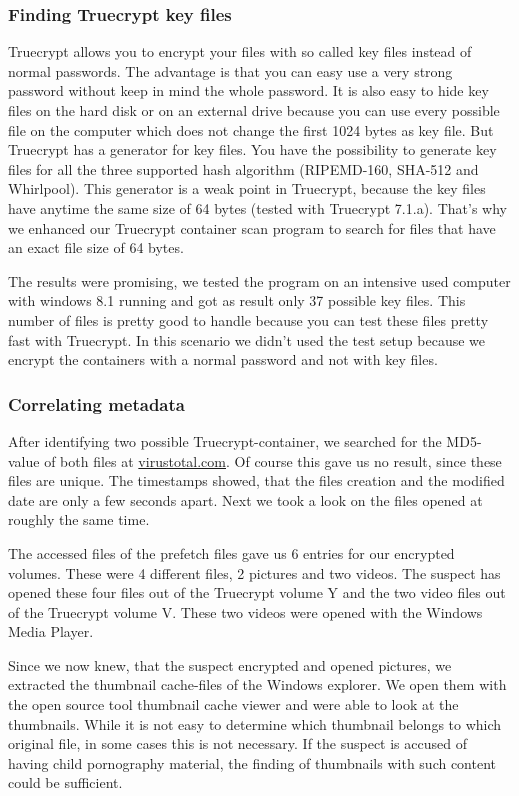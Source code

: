 \subsubsection{Finding Truecrypt key files}
Truecrypt allows you to encrypt your files with so called key files instead of normal passwords. The advantage is that you can easy use a very strong password without keep in mind the whole password. It is also easy to hide key files on the hard disk or on an external drive because you can use every possible file on the computer which does not change the first 1024 bytes as key file. But Truecrypt has a generator for key files. You have the possibility to generate key files for all the three supported hash algorithm (RIPEMD-160, SHA-512 and Whirlpool). This generator is a weak point in Truecrypt, because the key files have anytime the same size of 64 bytes (tested with Truecrypt 7.1.a). That's why we enhanced our Truecrypt container scan program to search for files that have an exact file size of 64 bytes.

The results were promising, we tested the program on an intensive used computer with windows 8.1 running and got as result only 37 possible key files. This number of files is pretty good to handle because you can test these files pretty fast with Truecrypt. In this scenario we didn't used the test setup because we encrypt the containers with a normal password and not with key files.
\subsubsection{Correlating metadata}
After identifying two possible Truecrypt-container, we searched for the MD5-value of both files at \url{virustotal.com}. Of course this gave us no result, since these files are unique. The timestamps showed, that the files creation and the modified date are only a few seconds apart. Next we took a look on the files opened at roughly the same time. 

The accessed files of the prefetch files gave us 6 entries for our encrypted volumes. These were 4 different files, 2 pictures and two videos.
The suspect has opened these four files out of the Truecrypt volume Y and the two video files out of the Truecrypt volume V. These two videos were opened with the Windows Media Player.

Since we now knew, that the suspect encrypted and opened pictures, we extracted the thumbnail cache-files of the Windows explorer. We open them with the open source tool thumbnail cache viewer and were able to look at the thumbnails. While it is not easy to determine which thumbnail belongs to which original file, in some cases this is not necessary. If the suspect is accused of having child pornography material, the finding of thumbnails with such content could be sufficient.

